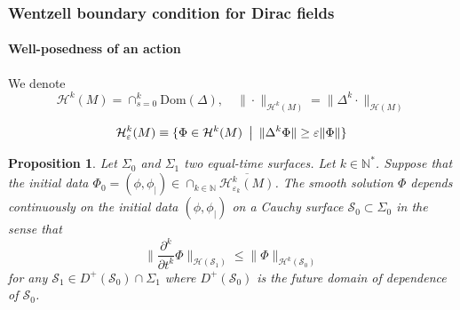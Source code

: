 \documentclass[french]{beamer}
\newcommand{\dom}{\mathrm{Dom}}
\newtheorem{proposition}{Proposition}
\begin{document}
\begin{frame}[shrink=10]
\frametitle{Wentzell boundary condition for Dirac fields}
\framesubtitle{Well-posedness of an action}

We denote 
\begin{equation*}
\mathcal{H}^k(M) = \cap_{s=0}^{k} \dom(\Delta), 
\quad
\| \cdot \|_{\mathcal{H}^k(M)} = \| \Delta^k \cdot \|_{\mathcal{H}(M)}
\end{equation*}

\begin{equation*}
\mathcal{H}_\varepsilon^k(M) \equiv
\{ \Phi \in \mathcal{H}^k(M) \enskip\big\vert\enskip \| \Delta^k \Phi\| \geq \varepsilon \| \Phi\| \}
\end{equation*}


\begin{proposition}
Let $\Sigma_0$ and $\Sigma_1$ two equal-time surfaces.
Let $k \in \mathbb{N}^*$.
Suppose that the initial data $\Phi_0 = (\phi, \phi_|)\in \cap_{k\in\mathbb{N}}\overline{\mathcal{H}^k_{\varepsilon_k}(M) }$.
The smooth solution $\Phi$ depends continuously on the initial data $(\phi, \phi_|)$ on a Cauchy surface $\mathcal{S}_0 \subset \Sigma_0$ in the sense that
\begin{equation*}
\big\| \frac{\partial^k}{\partial t^k} \Phi\big\|_{\mathcal{H}(\mathcal{S}_1)}
\leq
\big\| \Phi\big\|_{\mathcal{H}^{k}(\mathcal{S}_0)}
\end{equation*}
for any $\mathcal{S}_1 \in D^+(\mathcal{S}_0)\cap\Sigma_1$
where $D^+(\mathcal{S}_0)$ is the future domain of dependence of $\mathcal{S}_0$.
\end{proposition}

\end{frame}
\end{document}
